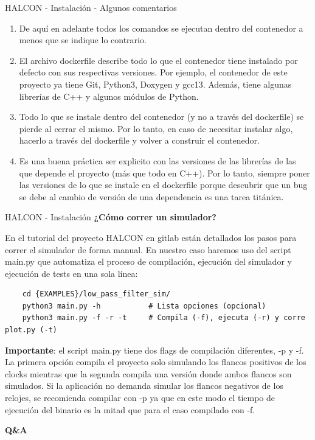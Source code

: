 \documentclass[11pt]{beamer}
\begin{document}
	\begin{frame}{HALCON - Instalación - Algunos comentarios}
	
	\begin{enumerate}
		\item De aquí en adelante todos los comandos se ejecutan dentro del contenedor a menos que se indique lo contrario.
		
		\item El archivo dockerfile describe todo lo que el contenedor tiene instalado por defecto con sus respectivas versiones. Por ejemplo, el contenedor de este proyecto ya tiene Git, Python3, Doxygen y gcc13. Además, tiene algunas librerías de C++ y algunos módulos de Python.
		
		\item Todo lo que se instale dentro del contenedor (y no a través del dockerfile) se pierde al cerrar el mismo. Por lo tanto, en caso de necesitar instalar algo, hacerlo a través del dockerfile y volver a construir el contenedor.
		
		\item Es una buena práctica ser explicito con las versiones de las librerías de las que depende el proyecto (más que todo en C++). Por lo tanto, siempre poner las versiones de lo que se instale en el dockerfile porque descubrir que un bug se debe al cambio de versión de una dependencia es una tarea titánica.
		
	\end{enumerate}
	\end{frame}
	
	\begin{frame}[fragile]{HALCON - Instalación}
	\textbf{¿Cómo correr un simulador?}\newline
	
	En el tutorial del proyecto HALCON en gitlab están detallados los pasos para correr el simulador de forma manual. En nuestro caso haremos uso del script main.py que automatiza el proceso de compilación, ejecución del simulador y ejecución de tests en una sola línea:
	
	\begin{lstlisting}
	cd {EXAMPLES}/low_pass_filter_sim/
	python3 main.py -h       	 # Lista opciones (opcional)
	python3 main.py -f -r -t	 # Compila (-f), ejecuta (-r) y corre plot.py (-t)
	\end{lstlisting}
	
	\footnotesize \textbf{Importante}: el script main.py tiene dos flags de compilación diferentes, -p y -f. La primera opción compila el proyecto solo simulando los flancos positivos de los clocks mientras que la segunda compila una versión donde ambos flancos son simulados. Si la aplicación no demanda simular los flancos negativos de los relojes, se recomienda compilar con -p ya que en este modo el tiempo de ejecución del binario es la mitad que para el caso compilado con -f.
	\end{frame}
	
	\begin{frame}
		
	\centering
		\Huge \textbf{Q\&A}

		
	\end{frame}
	
\end{document}
